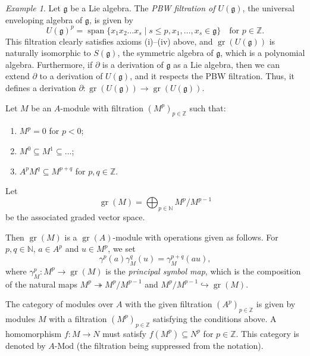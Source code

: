 \documentclass[a4paper, 12pt, reqno]{amsart}
\theoremstyle{remark}
\newtheorem{example}[theorem]{Example}
\DeclareMathOperator{\gr}{gr}
\DeclareMathOperator{\vspan}{span}
\begin{document}
\begin{example}
  \label{exa:1}
  Let $\mathfrak{g}$ be a Lie algebra.
  The \emph{PBW filtration of $U(\mathfrak{g})$}, the universal enveloping algebra of $\mathfrak{g}$, is given by
  \begin{equation*}
    U(\mathfrak{g})^p = \vspan\{x_1x_2\dots x_s \mid s \le p, x_1, \dots, x_s \in \mathfrak{g}\} \quad \text{for $p \in \mathbb{Z}$}.
  \end{equation*}
  This filtration clearly satisfies axioms (i)--(iv) above, and $\gr(U(\mathfrak{g}))$ is naturally isomorphic to $S(\mathfrak{g})$, the symmetric algebra of $\mathfrak{g}$, which is a polynomial algebra.
  Furthermore, if $\partial$ is a derivation of $\mathfrak{g}$ as a Lie algebra, then we can extend $\partial$ to a derivation of $U(\mathfrak{g})$, and it respects the PBW filtration.
  Thus, it defines a derivation $\partial: \gr(U(\mathfrak{g})) \to \gr(U(\mathfrak{g}))$.
\end{example}

Let $M$ be an $A$-module with filtration $(M^p)_{p \in \mathbb{Z}}$ such that:
\begin{enumerate}
\item $M^p = 0$ for $p < 0$;
\item $M^0 \subseteq M^1 \subseteq \dots$;
\item $A^pM^q \subseteq M^{p + q}$ for $p, q \in \mathbb{Z}$.
\end{enumerate}
Let
\begin{equation*}
  \gr(M) = \bigoplus_{p \in \mathbb{N}}M^p/M^{p - 1}
\end{equation*}
be the associated graded vector space.

Then $\gr(M)$ is a $\gr(A)$-module with operations given as follows.
For $p, q \in \mathbb{N}$, $a \in A^p$ and $u \in M^p$, we set
\begin{equation*}
  \gamma^p(a)\gamma^q_M(u) = \gamma^{p + q}_M(au),
\end{equation*}
where $\gamma^p_M: M^p \to \gr(M)$ is the \emph{principal symbol map}, which is the composition of the natural maps $M^p \twoheadrightarrow M^p/M^{p - 1}$ and $M^p/M^{p - 1} \hookrightarrow \gr(M)$.

The category of modules over $A$ with the given filtration $(A^p)_{p \in \mathbb{Z}}$ is given by modules $M$ with a filtration $(M^p)_{p \in \mathbb{Z}}$ satisfying the conditions above.
A homomorphism $f: M \to N$ must satisfy $f(M^p) \subseteq N^p$ for $p \in \mathbb{Z}$.
This category is denoted by $A\text{-Mod}$ (the filtration being suppressed from the notation).
\end{document}
